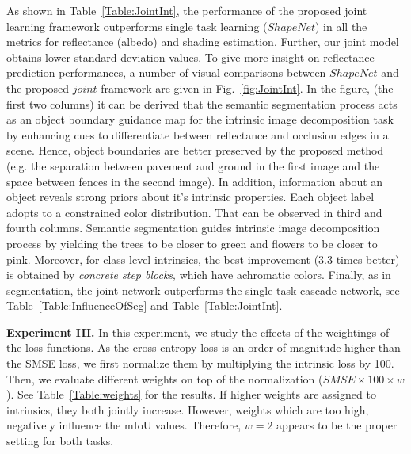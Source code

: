 \documentclass[runningheads]{llncs}
\begin{document}
\noindent As shown in Table~\ref{Table:JointInt}, the performance of the proposed joint learning framework outperforms single task learning ($ShapeNet$) in all the metrics for reflectance (albedo) and shading estimation. Further, our joint model obtains lower standard deviation values. To give more insight on reflectance prediction performances, a number of visual comparisons between $ShapeNet$ and the proposed $joint$ framework are given in Fig.~\ref{fig:JointInt}. In the figure, (the first two columns) it can be derived that the semantic segmentation process acts as an object boundary guidance map for the intrinsic image decomposition task by enhancing cues to differentiate between reflectance and occlusion edges in a scene. Hence, object boundaries are better preserved by the proposed method (e.g. the separation between pavement and ground in the first image and the space between fences in the second image). In addition, information about an object reveals strong priors about it's intrinsic properties. Each object label adopts to a constrained color distribution. That can be observed in third and fourth columns. Semantic segmentation guides intrinsic image decomposition process by yielding the trees to be closer to green and flowers to be closer to pink. Moreover, for class-level intrinsics, the best improvement (3.3 times better) is obtained by \emph{concrete step blocks}, which have achromatic colors. Finally, as in segmentation, the joint network outperforms the single task cascade network, see Table~\ref{Table:InfluenceOfSeg} and Table~\ref{Table:JointInt}.

\noindent \textbf{Experiment III.} In this experiment, we study the effects of the weightings of the loss functions. As the cross entropy loss is an order of magnitude higher than the SMSE loss, we first normalize them by multiplying the intrinsic loss by 100. Then, we evaluate different weights on top of the normalization ($SMSE\times100\times w$). See Table~\ref{Table:weights} for the results. If higher weights are assigned to intrinsics, they both jointly increase. However, weights which are too high, negatively influence the mIoU values. Therefore, $w = 2$ appears to be the proper setting for both tasks.
\end{document}
